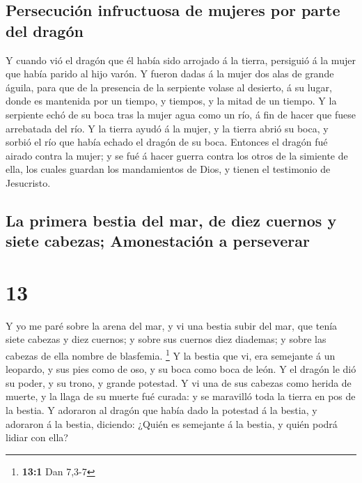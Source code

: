 \hypertarget{persecuciuxf3n-infructuosa-de-mujeres-por-parte-del-draguxf3n}{%
\subsection{Persecución infructuosa de mujeres por parte del
dragón}\label{persecuciuxf3n-infructuosa-de-mujeres-por-parte-del-draguxf3n}}

 Y cuando vió el dragón que él había sido arrojado á la
tierra, persiguió á la mujer que había parido al hijo varón.
 Y fueron dadas á la mujer dos alas de grande águila,
para que de la presencia de la serpiente volase al desierto, á su lugar,
donde es mantenida por un tiempo, y tiempos, y la mitad de un tiempo.
 Y la serpiente echó de su boca tras la mujer agua como
un río, á fin de hacer que fuese arrebatada del río.  Y
la tierra ayudó á la mujer, y la tierra abrió su boca, y sorbió el río
que había echado el dragón de su boca.  Entonces el
dragón fué airado contra la mujer; y se fué á hacer guerra contra los
otros de la simiente de ella, los cuales guardan los mandamientos de
Dios, y tienen el testimonio de Jesucristo.

\hypertarget{la-primera-bestia-del-mar-de-diez-cuernos-y-siete-cabezas-amonestaciuxf3n-a-perseverar}{%
\subsection{La primera bestia del mar, de diez cuernos y siete cabezas;
Amonestación a
perseverar}\label{la-primera-bestia-del-mar-de-diez-cuernos-y-siete-cabezas-amonestaciuxf3n-a-perseverar}}

\hypertarget{section-12}{%
\section{13}\label{section-12}}

 Y yo me paré sobre la arena del mar, y vi una bestia
subir del mar, que tenía siete cabezas y diez cuernos; y sobre sus
cuernos diez diademas; y sobre las cabezas de ella nombre de blasfemia.
\footnote{\textbf{13:1} Dan 7,3-7}  Y la bestia que vi,
era semejante á un leopardo, y sus pies como de oso, y su boca como boca
de león. Y el dragón le dió su poder, y su trono, y grande potestad.
 Y vi una de sus cabezas como herida de muerte, y la llaga
de su muerte fué curada: y se maravilló toda la tierra en pos de la
bestia.  Y adoraron al dragón que había dado la potestad á
la bestia, y adoraron á la bestia, diciendo: ¿Quién es semejante á la
bestia, y quién podrá lidiar con ella?

